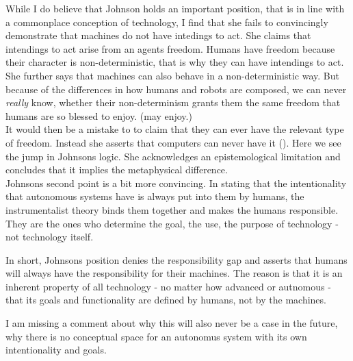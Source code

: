 \documentclass{article}
\begin{document}
While I do believe that Johnson holds an important position, that is in line
with a commonplace conception of technology, I find that she fails to
convincingly demonstrate that machines do not have intedings to act. She claims that
intendings to act arise from an agents freedom. Humans have freedom because
their character is non-deterministic, that is why they can have intendings to
act. She further says that machines can also behave in a non-deterministic way.
But because of the differences in how humans and robots are composed, we can
never \textit{really} know, whether their non-determinism grants them the same
freedom that humans are so blessed to enjoy. (may enjoy.)\\ It would then be a
mistake to to claim that they can ever have the relevant type of freedom.
Instead she asserts that computers can never have it (\cite[p.
203]{johnson2006computer}). Here we see the jump in Johnsons logic. She
acknowledges an epistemological limitation and concludes that it
implies the metaphysical difference.\\

Johnsons second point is a bit more convincing. In stating that the
intentionality that autonomous systems have is always put into them by humans, the
instrumentalist theory binds them together and makes the humans responsible.
They are the ones who determine the goal, the use, the purpose of technology -
not technology itself. 

In short, Johnsons position denies the responsibility gap and asserts that
humans will always have the responsibility for their machines. The reason is
that it is an inherent property of all technology - no matter how advanced or
autnomous - that its goals and functionality are defined by humans, not by the
machines.

I am missing a comment about why this will also never be
a case in the future, why there is no conceptual space for an autonomus system
with its own intentionality and goals.\\
\end{document}

